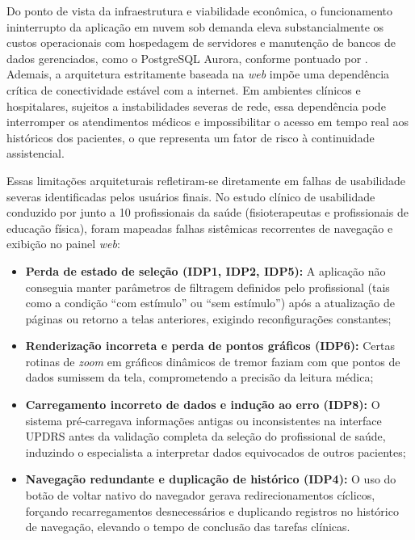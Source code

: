 Do ponto de vista da infraestrutura e viabilidade econômica, o funcionamento ininterrupto da aplicação em nuvem sob demanda eleva substancialmente os custos operacionais com hospedagem de servidores e manutenção de bancos de dados gerenciados, como o PostgreSQL Aurora, conforme pontuado por \cite{oliveira2023}. Ademais, a arquitetura estritamente baseada na \textit{web} impõe uma dependência crítica de conectividade estável com a internet. Em ambientes clínicos e hospitalares, sujeitos a instabilidades severas de rede, essa dependência pode interromper os atendimentos médicos e impossibilitar o acesso em tempo real aos históricos dos pacientes, o que representa um fator de risco à continuidade assistencial.

Essas limitações arquiteturais refletiram-se diretamente em falhas de usabilidade severas identificadas pelos usuários finais. No estudo clínico de usabilidade conduzido por \cite{rabelo2025} junto a 10 profissionais da saúde (fisioterapeutas e profissionais de educação física), foram mapeadas falhas sistêmicas recorrentes de navegação e exibição no painel \textit{web}:

\begin{itemize}
    \item \textbf{Perda de estado de seleção (IDP1, IDP2, IDP5):} A aplicação não conseguia manter parâmetros de filtragem definidos pelo profissional (tais como a condição ``com estímulo'' ou ``sem estímulo'') após a atualização de páginas ou retorno a telas anteriores, exigindo reconfigurações constantes;
    \item \textbf{Renderização incorreta e perda de pontos gráficos (IDP6):} Certas rotinas de \textit{zoom} em gráficos dinâmicos de tremor faziam com que pontos de dados sumissem da tela, comprometendo a precisão da leitura médica;
    \item \textbf{Carregamento incorreto de dados e indução ao erro (IDP8):} O sistema pré-carregava informações antigas ou inconsistentes na interface UPDRS antes da validação completa da seleção do profissional de saúde, induzindo o especialista a interpretar dados equivocados de outros pacientes;
    \item \textbf{Navegação redundante e duplicação de histórico (IDP4):} O uso do botão de voltar nativo do navegador gerava redirecionamentos cíclicos, forçando recarregamentos desnecessários e duplicando registros no histórico de navegação, elevando o tempo de conclusão das tarefas clínicas.
\end{itemize}

